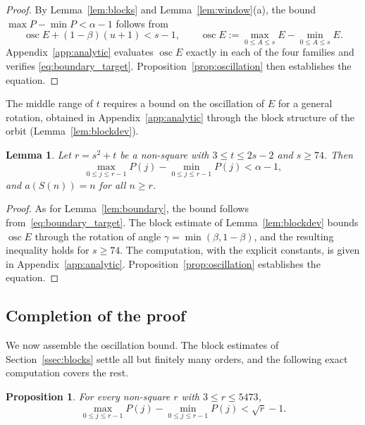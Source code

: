 \documentclass{birkjour}
\newtheorem{proposition}[theorem]{Proposition}
\newtheorem{lemma}[theorem]{Lemma}
\theoremstyle{definition}
\theoremstyle{remark}
\begin{document}
\begin{proof}
By Lemma~\ref{lem:blocks} and Lemma~\ref{lem:window}(a), the
bound $\max P-\min P<\alpha-1$ follows from
\begin{equation}\label{eq:boundary_target}
  \operatorname{osc}E+(1-\beta)(u+1)<s-1,
  \qquad
  \operatorname{osc}E
  :=\max_{0\le A\le s}E-\min_{0\le A\le s}E.
\end{equation}
Appendix~\ref{app:analytic} evaluates $\operatorname{osc}E$
exactly in each of the four families and verifies
\eqref{eq:boundary_target}.
Proposition~\ref{prop:oscillation} then establishes the equation.
\end{proof}

The middle range of $t$ requires a bound on the oscillation
of $E$ for a general rotation, obtained in
Appendix~\ref{app:analytic} through the block structure of the
orbit (Lemma~\ref{lem:blockdev}).

\begin{lemma}\label{lem:middle}
Let $r=s^{2}+t$ be a non-square with $3\le t\le 2s-2$ and
$s\ge 74$. Then
\[
  \max_{0\le j\le r-1}P(j)-\min_{0\le j\le r-1}P(j)
  <\alpha-1,
\]
and $a(S(n))=n$ for all $n\ge r$.
\end{lemma}

\begin{proof}
As for Lemma~\ref{lem:boundary}, the bound follows
from~\eqref{eq:boundary_target}. The block estimate of
Lemma~\ref{lem:blockdev} bounds $\operatorname{osc}E$ through
the rotation of angle $\gamma=\min(\beta,1-\beta)$, and the
resulting inequality holds for $s\ge 74$. The computation,
with the explicit constants, is given in
Appendix~\ref{app:analytic}.
Proposition~\ref{prop:oscillation} establishes the equation.
\end{proof}


\subsection{Completion of the proof}
\label{ssec:completion}

We now assemble the oscillation bound. The block estimates of
Section~\ref{ssec:blocks} settle all but finitely many
orders, and the following exact computation covers the rest.

\begin{proposition}\label{prop:finite}
For every non-square $r$ with $3\le r\le 5473$,
\[
  \max_{0\le j\le r-1}P(j)-\min_{0\le j\le r-1}P(j)<\sqrt{r}-1.
\]
\end{proposition}
\end{document}
